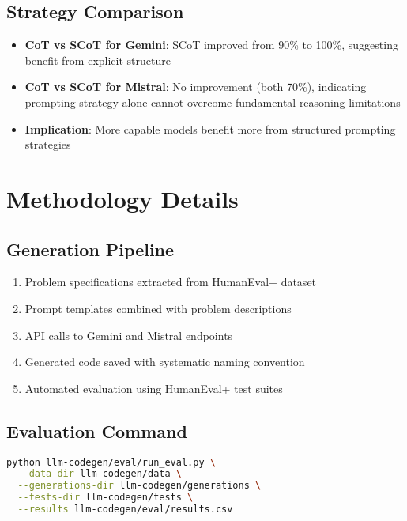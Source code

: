 \documentclass[11pt]{article}
\begin{document}
\subsection{Strategy Comparison}

\begin{itemize}
    \item \textbf{CoT vs SCoT for Gemini}: SCoT improved from 90\% to 100\%, suggesting benefit from explicit structure
    \item \textbf{CoT vs SCoT for Mistral}: No improvement (both 70\%), indicating prompting strategy alone cannot overcome fundamental reasoning limitations
    \item \textbf{Implication}: More capable models benefit more from structured prompting strategies
\end{itemize}

\section{Methodology Details}

\subsection{Generation Pipeline}

\begin{enumerate}
    \item Problem specifications extracted from HumanEval+ dataset
    \item Prompt templates combined with problem descriptions
    \item API calls to Gemini and Mistral endpoints
    \item Generated code saved with systematic naming convention
    \item Automated evaluation using HumanEval+ test suites
\end{enumerate}

\subsection{Evaluation Command}

\begin{lstlisting}[language=bash]
python llm-codegen/eval/run_eval.py \
  --data-dir llm-codegen/data \
  --generations-dir llm-codegen/generations \
  --tests-dir llm-codegen/tests \
  --results llm-codegen/eval/results.csv
\end{lstlisting}
\end{document}
